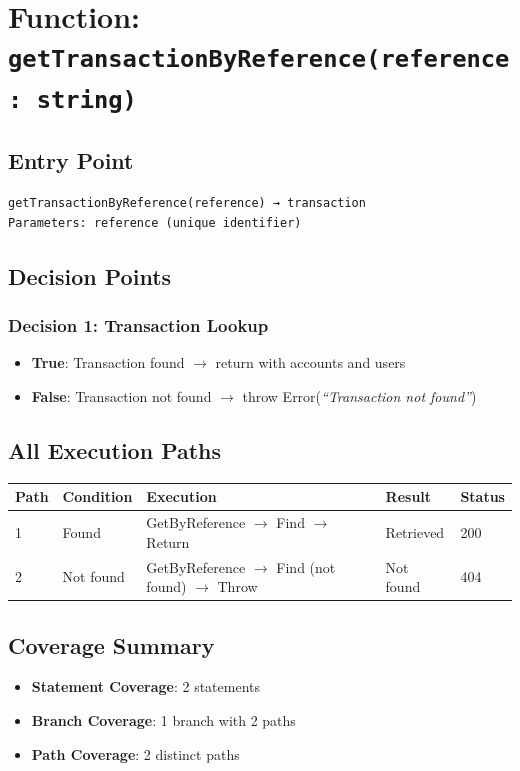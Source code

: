 \section{Function: \texttt{getTransactionByReference(reference: string)}}

\subsection{Entry Point}
\begin{verbatim}
getTransactionByReference(reference) → transaction
Parameters: reference (unique identifier)
\end{verbatim}

\subsection{Decision Points}

\subsubsection{Decision 1: Transaction Lookup}
\begin{itemize}
    \item \textbf{True}: Transaction found $\rightarrow$ return with accounts and users
    \item \textbf{False}: Transaction not found $\rightarrow$ throw Error(\textit{``Transaction not found''})
\end{itemize}

\subsection{All Execution Paths}

\begin{longtable}{|L{0.8cm}|L{3cm}|L{5.5cm}|L{2.5cm}|L{1.2cm}|}
\hline
\textbf{Path} & \textbf{Condition} & \textbf{Execution} & \textbf{Result} & \textbf{Status} \\
 & Found & GetByReference $\rightarrow$ Find $\rightarrow$ Return & Retrieved & 200 \\
 & Not found & GetByReference $\rightarrow$ Find (not found) $\rightarrow$ Throw & Not found & 404 \\
\hline
\end{longtable}

\subsection{Coverage Summary}
\begin{itemize}
    \item \textbf{Statement Coverage}: 2 statements
    \item \textbf{Branch Coverage}: 1 branch with 2 paths
    \item \textbf{Path Coverage}: 2 distinct paths
\end{itemize}

